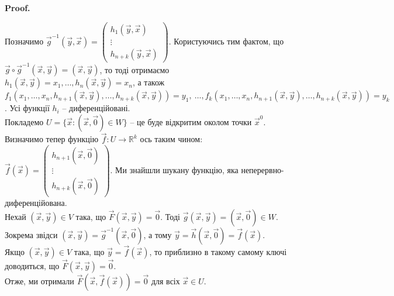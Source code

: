 \documentclass[a4paper, 10pt]{article}
\makeatletter
\theoremstyle{theoremdd}
\theoremstyle{theoremdd}
\theoremstyle{theoremdd}
\theoremstyle{theoremdd}
\theoremstyle{theoremdd}
\theoremstyle{theoremdd}
\theoremstyle{theoremdd}
\theoremstyle{theoremdd}
\theoremstyle{theoremdd}
\renewenvironment{proof}[1][Proof.\\]{\par
\pushQED{\hfill \qed}%
\normalfont \topsep6\p@\@plus6\p@\relax
\trivlist
\item\relax
{\bfseries
#1\@addpunct{.}}\hspace\labelsep\ignorespaces
}{%
\popQED\endtrivlist\@endpefalse
}
\makeatother
\begin{document}
\begin{proof}
Позначимо $\vec{g}^{-1}(\vec{y},\vec{x}) = \begin{pmatrix}
h_1(\vec{y},\vec{x}) \\
\vdots \\
h_{n+k}(\vec{y},\vec{x})
\end{pmatrix}$. Користуючись тим фактом, що $\vec{g} \circ \vec{g}^{-1} (\vec{x},\vec{y}) = (\vec{x},\vec{y})$, то тоді отримаємо $h_1(\vec{x},\vec{y}) = x_1,\dots, h_n(\vec{x},\vec{y}) = x_n$, а також $f_1(x_1,\dots,x_n,h_{n+1}(\vec{x},\vec{y}),\dots,h_{n+k}(\vec{x},\vec{y})) = y_1,\ \dots, f_k(x_1,\dots,x_n,h_{n+1}(\vec{x},\vec{y}),\dots,h_{n+k}(\vec{x},\vec{y})) = y_k$. Усі функції $h_i$ -- диференційовані.\\
Покладемо $U = \{\vec{x} : (\vec{x},\vec{0}) \in W\}$ -- це буде відкритим околом точки $\vec{x}^0$. Визначимо тепер функцію $\vec{f} \colon U \to \mathbb{R}^{k}$ ось таким чином: $\vec{f}(\vec{x}) = \begin{pmatrix}
h_{n+1}(\vec{x},\vec{0}) \\
\vdots \\
h_{n+k}(\vec{x},\vec{0})
\end{pmatrix}$. Ми знайшли шукану функцію, яка неперервно-диференційована.\\
Нехай $(\vec{x},\vec{y}) \in V$ така, що $\vec{F}(\vec{x},\vec{y}) = \vec{0}$. Тоді $\vec{g}(\vec{x},\vec{y}) = (\vec{x},\vec{0}) \in W$.  Зокрема звідси $(\vec{x},\vec{y}) = \vec{g}^{-1}(\vec{x},\vec{0})$, а тому $\vec{y} = \vec{h}(\vec{x},\vec{0}) = \vec{f}(\vec{x})$.\\
Якщо $(\vec{x},\vec{y}) \in V$ така, що $\vec{y} = \vec{f}(\vec{x})$, то приблизно в такому самому ключі доводиться, що $\vec{F}(\vec{x},\vec{y}) = \vec{0}$.\\
Отже, ми отримали $\vec{F}(\vec{x},\vec{f}(\vec{x})) = \vec{0}$ для всіх $\vec{x} \in U$.
\end{proof}
\end{document}
